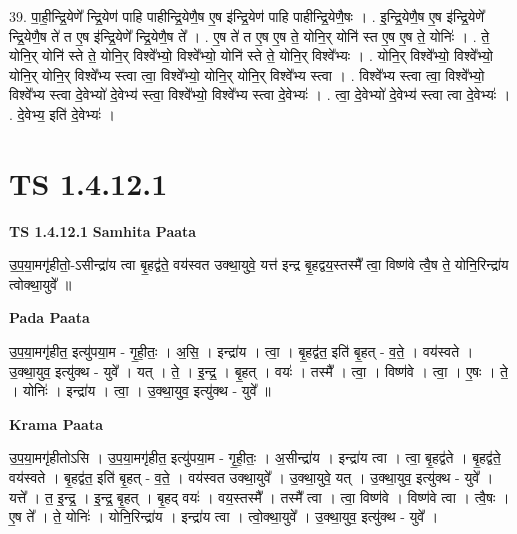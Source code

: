\documentclass[17pt]{extarticle}
\begin{document}
39. पा॒ही॒न्द्रि॒येणे᳚ न्द्रि॒येण॑ पाहि पाहीन्द्रि॒येणै॒ष ए॒ष इ॑न्द्रि॒येण॑ पाहि पाहीन्द्रि॒येणै॒षः । . इ॒न्द्रि॒येणै॒ष ए॒ष इ॑न्द्रि॒येणे᳚ न्द्रि॒येणै॒ष ते॑ त ए॒ष इ॑न्द्रि॒येणे᳚ न्द्रि॒येणै॒ष ते᳚ । . ए॒ष ते॑ त ए॒ष ए॒ष ते॒ योनि॒र् योनि॑ स्त ए॒ष ए॒ष ते॒ योनिः॑ । . ते॒ योनि॒र् योनि॑ स्ते ते॒ योनि॒र् विश्वे᳚भ्यो॒ विश्वे᳚भ्यो॒ योनि॑ स्ते ते॒ योनि॒र् विश्वे᳚भ्यः । . योनि॒र् विश्वे᳚भ्यो॒ विश्वे᳚भ्यो॒ योनि॒र् योनि॒र् विश्वे᳚भ्य स्त्वा त्वा॒ विश्वे᳚भ्यो॒ योनि॒र् योनि॒र् विश्वे᳚भ्य स्त्वा । . विश्वे᳚भ्य स्त्वा त्वा॒ विश्वे᳚भ्यो॒ विश्वे᳚भ्य स्त्वा दे॒वेभ्यो॑ दे॒वेभ्य॑ स्त्वा॒ विश्वे᳚भ्यो॒ विश्वे᳚भ्य स्त्वा दे॒वेभ्यः॑ । . त्वा॒ दे॒वेभ्यो॑ दे॒वेभ्य॑ स्त्वा त्वा दे॒वेभ्यः॑ । . दे॒वेभ्य॒ इति॑ दे॒वेभ्यः॑ । \newline
\pagebreak
{}

\section{ TS 1.4.12.1 }

\textbf{TS 1.4.12.1 } \newline
\textbf{Samhita Paata} \newline

उ॒प॒या॒मगृ॑हीतो॒-ऽसीन्द्रा॑य त्वा बृ॒हद्व॑ते॒ वय॑स्वत उक्था॒युवे॒ यत्त॑ इन्द्र बृ॒हद्वय॒स्तस्मै᳚ त्वा॒ विष्ण॑वे त्वै॒ष ते॒ योनि॒रिन्द्रा॑य त्वोक्था॒युवे᳚ ॥ \newline

\textbf{Pada Paata} \newline

उ॒प॒या॒मगृ॑हीत॒ इत्यु॑पया॒म - गृ॒ही॒तः॒ । अ॒सि॒ । इन्द्रा॑य । त्वा॒ । बृ॒हद्व॑त॒ इति॑ बृ॒हत् - व॒ते॒ । वय॑स्वते । उ॒क्था॒युव॒ इत्यु॑क्थ - युवे᳚ । यत् । ते॒ । इ॒न्द्र॒ । बृ॒हत् । वयः॑ । तस्मै᳚ । त्वा॒ । विष्ण॑वे । त्वा॒ । ए॒षः । ते॒ । योनिः॑ । इन्द्रा॑य । त्वा॒ । उ॒क्था॒युव॒ इत्यु॑क्थ - युवे᳚ ॥  \newline


\textbf{Krama Paata} \newline

उ॒प॒या॒मगृ॑हीतोऽसि । उ॒प॒या॒मगृ॑हीत॒ इत्यु॑पया॒म - गृ॒ही॒तः॒ । अ॒सीन्द्रा॑य । इन्द्रा॑य त्वा । त्वा॒ बृ॒हद्व॑ते । बृ॒हद्व॑ते॒ वय॑स्वते । बृ॒हद्व॑त॒ इति॑ बृ॒हत् - व॒ते॒ । वय॑स्वत उक्था॒युवे᳚ । उ॒क्था॒युवे॒ यत् । उ॒क्था॒युव॒ इत्यु॑क्थ - युवे᳚ । यत्ते᳚ । त॒ इ॒न्द्र॒ । इ॒न्द्र॒ बृ॒हत् । बृ॒हद् वयः॑ । वय॒स्तस्मै᳚ । तस्मै᳚ त्वा । त्वा॒ विष्ण॑वे । विष्ण॑वे त्वा । त्वै॒षः । ए॒ष ते᳚ । ते॒ योनिः॑ । योनि॒रिन्द्रा॑य । इन्द्रा॑य त्वा । त्वो॒क्था॒युवे᳚ । उ॒क्था॒युव॒ इत्यु॑क्थ - युवे᳚ । \newline
\end{document}
